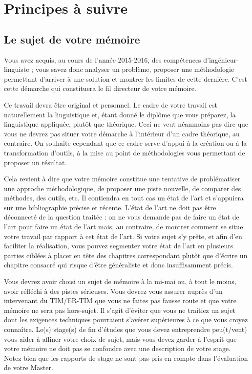 \chapter{Principes à suivre}

\section{Le sujet de votre mémoire}
Vous avez acquis, au cours de l'année 2015-2016, des compétences d'ingénieur-linguiste ; vous savez donc analyser un problème, proposer une méthodologie permettant d'arriver à une solution et montrer les limites de cette dernière. C'est cette démarche qui constituera le fil directeur de votre mémoire.

Ce travail devra être original et personnel. Le cadre de votre travail est naturellement la linguistique et, étant donné le diplôme que vous préparez, la linguistique appliquée, plutôt que théorique. Ceci ne veut néanmoins pas dire que vous ne devrez pas situer votre démarche à l'intérieur d'un cadre théorique, au contraire. On souhaite cependant que ce cadre serve d'appui à la création ou à la transformation d'outils, à la mise au point de méthodologies vous permettant de proposer un résultat.

Cela revient à dire que votre mémoire constitue une tentative de problématiser une approche méthodologique, de proposer une piste nouvelle, de comparer des méthodes, des outils, etc. Il contiendra en tout cas un état de l'art et s'appuiera sur une bibliographie précise et récente. L'état de l'art ne doit pas être déconnecté de la question traitée : on ne vous demande pas de \og{}faire un état de l'art pour faire un état de l'art\fg{} mais, au contraire, de montrer comment se situe votre travail par rapport à cet état de l'art.
Si votre sujet s'y prête, et afin d'en faciliter la réalisation, vous pouvez segmenter votre état de l'art en plusieurs parties ciblées à placer en tête des chapitres correspondant plutôt que d'écrire un chapitre consacré qui risque d'être généraliste et donc insuffisamment précis.

Vous devrez avoir choisi un sujet de mémoire à la mi-mai ou, à tout le moins, avoir réfléchi à des pistes sérieuses. Vous devrez vous assurer auprès d'un intervenant du TIM/ER-TIM que vous ne faites pas fausse route et que votre mémoire ne sera pas hors-sujet. Il s'agit d'éviter que vous ne traitiez un sujet dont les exigences techniques pourraient s'avérer supérieures à ce que vous croyez connaître. Le(s) stage(s) de fin d'études que vous devez entreprendre peu(t/vent) vous aider à affiner votre choix de sujet, mais vous devez garder à l'esprit que votre mémoire ne doit pas se confondre avec une description de votre stage. Notez bien que les rapports de stage ne sont pas pris en compte dans l'évaluation de votre Master.


